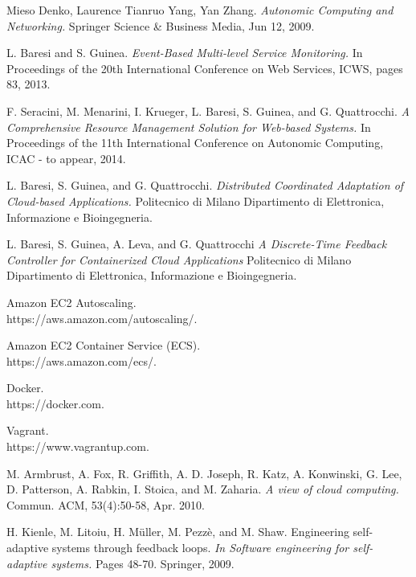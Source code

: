 

\begin{thebibliography}{9}

Mieso Denko, Laurence Tianruo Yang, Yan Zhang.
\textit{Autonomic Computing and Networking.}
Springer Science \& Business Media, Jun 12, 2009.

L. Baresi and S. Guinea.
\textit{Event-Based Multi-level
Service Monitoring.}
In Proceedings of the 20th
International Conference on Web Services, ICWS, pages 83, 2013.

F. Seracini, M. Menarini, I. Krueger, L. Baresi,
S. Guinea, and G. Quattrocchi.
\textit{A Comprehensive
Resource Management Solution for Web-based
Systems.}
 In Proceedings of the 11th International
Conference on Autonomic Computing, ICAC - to
appear, 2014.

L. Baresi,
S. Guinea, and G. Quattrocchi.
\textit{Distributed Coordinated Adaptation
of Cloud-based Applications.}
Politecnico di Milano
Dipartimento di Elettronica, Informazione e Bioingegneria.

L. Baresi, S. Guinea, A. Leva, and G. Quattrocchi
\textit{A Discrete-Time Feedback Controller
for Containerized Cloud Applications}
Politecnico di Milano
Dipartimento di Elettronica, Informazione e Bioingegneria.

Amazon EC2 Autoscaling.\\
https://aws.amazon.com/autoscaling/.

Amazon EC2 Container Service (ECS).\\
https://aws.amazon.com/ecs/.

Docker. \\
https://docker.com.

Vagrant.  \\
https://www.vagrantup.com.

M. Armbrust, A. Fox, R. Griffith, A. D. Joseph,
R. Katz, A. Konwinski, G. Lee, D. Patterson,
A. Rabkin, I. Stoica, and M. Zaharia.
\textit{A view of cloud
computing.}
Commun. ACM, 53(4):50-58, Apr. 2010.

H. Kienle, M. Litoiu, H. Müller, M. Pezzè, and
M. Shaw. Engineering self-adaptive systems through
feedback loops.
\textit{In Software engineering for
self-adaptive systems.}
Pages 48-70. Springer, 2009.


\end{thebibliography}
